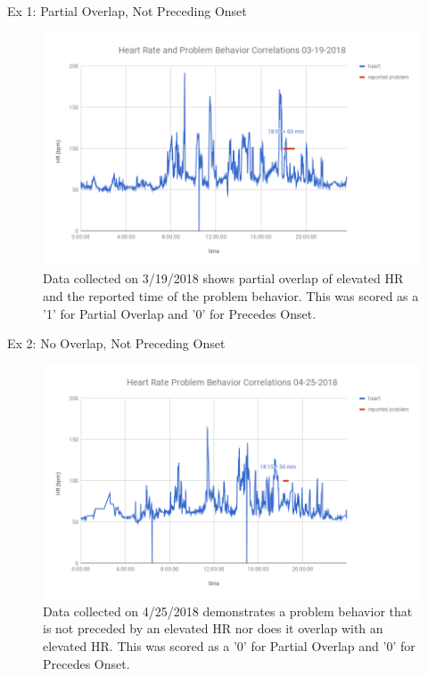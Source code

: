 \documentclass[final]{beamer}
\newlength{\onecolwid}
\newlength{\twocolwid}
\begin{document}
\begin{frame}[t]
\begin{columns}[t]
\begin{column}{\twocolwid}
\begin{columns}[t,totalwidth=\twocolwid]
\begin{column}{\onecolwid}

\begin{block}{Ex 1: Partial Overlap, Not Preceding Onset}
	
	\begin{figure}
		\includegraphics[width=0.8\linewidth]{Example1.png}
		\caption{Data collected on 3/19/2018 shows partial overlap of elevated HR and the reported time of the problem behavior. This was scored as a '1' for Partial Overlap and '0' for Precedes Onset.}
	\end{figure}
	
\end{block}


\begin{block}{Ex 2: No Overlap, Not Preceding Onset}
	
	\begin{figure}
		\includegraphics[width=0.8\linewidth]{Example2.png}
		\caption{Data collected on 4/25/2018 demonstrates a problem behavior that is not preceded by an elevated HR nor does it overlap with an elevated HR. This was scored as a '0' for Partial Overlap and '0' for Precedes Onset. }
	\end{figure}
	

\end{block}
\end{column}
\end{columns}
\end{column}
\end{columns}
\end{frame}
\end{document}

